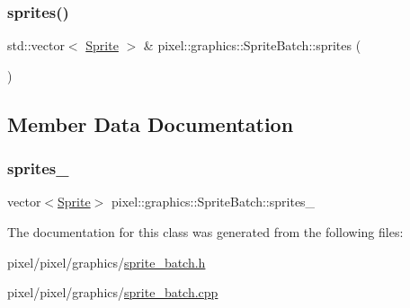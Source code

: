 \subsubsection{\texorpdfstring{sprites()}{sprites()}}
{\footnotesize\ttfamily std\+::vector$<$ \hyperlink{classpixel_1_1graphics_1_1_sprite}{Sprite} $>$ \& pixel\+::graphics\+::\+Sprite\+Batch\+::sprites (\begin{DoxyParamCaption}{ }\end{DoxyParamCaption})}



\subsection{Member Data Documentation}
\mbox{\label{classpixel_1_1graphics_1_1_sprite_batch_a46d82e006276b2bd2061dd12d5d14f91}} 
\subsubsection{\texorpdfstring{sprites\+\_\+}{sprites\_}}
{\footnotesize\ttfamily vector$<$\hyperlink{classpixel_1_1graphics_1_1_sprite}{Sprite}$>$ pixel\+::graphics\+::\+Sprite\+Batch\+::sprites\+\_\+\hspace{0.3cm}{\ttfamily [private]}}



The documentation for this class was generated from the following files\+:\begin{DoxyCompactItemize}
\item 
pixel/pixel/graphics/\hyperlink{sprite__batch_8h}{sprite\+\_\+batch.\+h}\item 
pixel/pixel/graphics/\hyperlink{sprite__batch_8cpp}{sprite\+\_\+batch.\+cpp}\end{DoxyCompactItemize}
